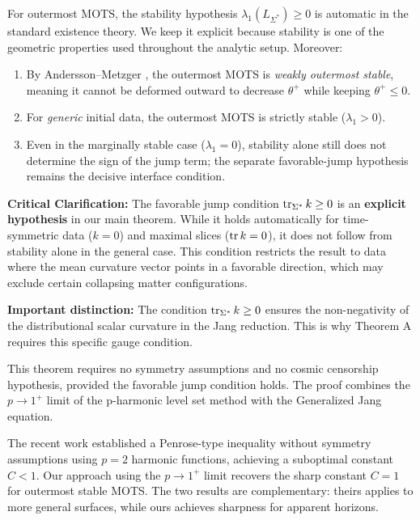 \begin{remark}\label{rem:StabilityEssential}
For outermost MOTS, the stability hypothesis $\lambda_1(L_{\Sigma^*}) \ge 0$ is automatic in the standard existence theory. We keep it explicit because stability is one of the geometric properties used throughout the analytic setup. Moreover:
\begin{enumerate}
    \item By Andersson--Metzger \cite{anderssonmetzger2009}, the outermost MOTS is \emph{weakly outermost stable}, meaning it cannot be deformed outward to decrease $\theta^+$ while keeping $\theta^+ \le 0$.
    \item For \emph{generic} initial data, the outermost MOTS is strictly stable ($\lambda_1 > 0$).
    \item Even in the marginally stable case ($\lambda_1 = 0$), stability alone still does not determine the sign of the jump term; the separate favorable-jump hypothesis remains the decisive interface condition.
\end{enumerate}
\textbf{Critical Clarification:} The favorable jump condition $\operatorname{tr}_{\Sigma^*} k \ge 0$ is an \textbf{explicit hypothesis} in our main theorem. While it holds automatically for time-symmetric data ($k=0$) and maximal slices ($\operatorname{tr} k = 0$), it does not follow from stability alone in the general case. This condition restricts the result to data where the mean curvature vector points in a favorable direction, which may exclude certain collapsing matter configurations.

\textbf{Important distinction:} The condition $\operatorname{tr}_{\Sigma^*} k \ge 0$ ensures the non-negativity of the distributional scalar curvature in the Jang reduction. This is why Theorem A requires this specific gauge condition.
\end{remark}

This theorem requires no symmetry assumptions and no cosmic censorship hypothesis, provided the favorable jump condition holds. The proof combines the $p \to 1^+$ limit of the p-harmonic level set method with the Generalized Jang equation.

\begin{remark}
The recent work \cite{allenbrydenkazaraskhuri2025} established a Penrose-type inequality without symmetry assumptions using $p=2$ harmonic functions, achieving a suboptimal constant $C < 1$. Our approach using the $p \to 1^+$ limit recovers the sharp constant $C = 1$ for outermost stable MOTS. The two results are complementary: theirs applies to more general surfaces, while ours achieves sharpness for apparent horizons.
\end{remark}

